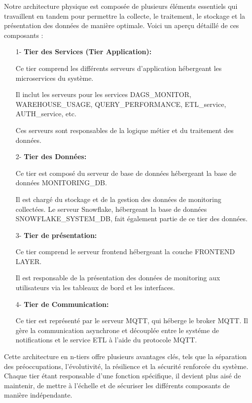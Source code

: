         \par Notre architecture physique est composée de plusieurs éléments essentiels qui travaillent en tandem pour permettre la collecte, le traitement, le stockage et la présentation des données de manière optimale. Voici un aperçu détaillé de ces composants :
        \begin{enumerate}
            \item[1-] \textbf{Tier des Services (Tier Application): } 
            \par Ce tier comprend les différents serveurs d'application hébergeant les microservices du système.
            \par Il inclut les serveurs pour les services DAGS\_MONITOR, WAREHOUSE\_USAGE, QUERY\_PERFORMANCE, ETL\_service, AUTH\_service, etc.
            \par Ces serveurs sont responsables de la logique métier et du traitement des données.
            \item [2-] \textbf{Tier des Données:} 
            \par Ce tier est composé du serveur de base de données hébergeant la base de données MONITORING\_DB.
            \par Il est chargé du stockage et de la gestion des données de monitoring collectées.
             Le serveur Snowflake, hébergeant la base de données SNOWFLAKE\_SYSTEM\_DB, fait également partie de ce tier des données.
             
            \item[3-]  \textbf{Tier de présentation: }
            \par Ce tier comprend le serveur frontend hébergeant la couche FRONTEND LAYER.
            \par Il est responsable de la présentation des données de monitoring aux utilisateurs via les tableaux de bord et les interfaces.
            \item[4-] \textbf{Tier de Communication:}
            \par Ce tier est représenté par le serveur MQTT, qui héberge le broker MQTT. Il gère la communication asynchrone et découplée entre le systéme de notifications et
             le service ETL à l'aide du protocole MQTT.

        \end{enumerate}
    \par Cette architecture en n-tiers offre plusieurs avantages clés, tels que la séparation des préoccupations, l'évolutivité, la résilience et la sécurité renforcée du système. 
    Chaque tier étant responsable d'une fonction spécifique, il devient plus aisé de maintenir, de mettre à l'échelle et de sécuriser les différents composants de manière indépendante.
